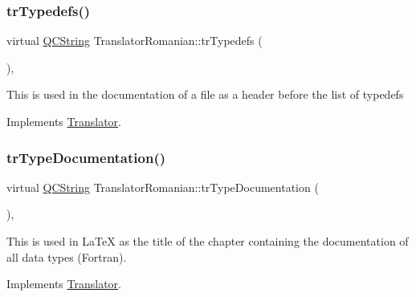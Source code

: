 \mbox{\label{class_translator_romanian_a209fcea008fa57a030c15c33ea2e2456}} 
\subsubsection{\texorpdfstring{trTypedefs()}{trTypedefs()}}
{\footnotesize\ttfamily virtual \mbox{\hyperlink{class_q_c_string}{Q\+C\+String}} Translator\+Romanian\+::tr\+Typedefs (\begin{DoxyParamCaption}{ }\end{DoxyParamCaption})\hspace{0.3cm}{\ttfamily [inline]}, {\ttfamily [virtual]}}

This is used in the documentation of a file as a header before the list of typedefs 

Implements \mbox{\hyperlink{class_translator}{Translator}}.

\mbox{\label{class_translator_romanian_ac3eda067ce189ce19a573bbc347bb4e0}} 
\subsubsection{\texorpdfstring{trTypeDocumentation()}{trTypeDocumentation()}}
{\footnotesize\ttfamily virtual \mbox{\hyperlink{class_q_c_string}{Q\+C\+String}} Translator\+Romanian\+::tr\+Type\+Documentation (\begin{DoxyParamCaption}{ }\end{DoxyParamCaption})\hspace{0.3cm}{\ttfamily [inline]}, {\ttfamily [virtual]}}

This is used in La\+TeX as the title of the chapter containing the documentation of all data types (Fortran). 

Implements \mbox{\hyperlink{class_translator}{Translator}}.

\mbox{\label{class_translator_romanian_a6a20cd157cdf6018ff8c50450eaecaef}} 
